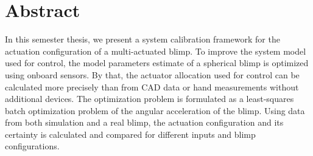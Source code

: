 \chapter*{Abstract}

In this semester thesis, we present a system calibration framework for the actuation configuration of a multi-actuated blimp.
To improve the system model used for control, the model parameters estimate of a spherical blimp is optimized using onboard sensors.
By that, the actuator allocation used for control can be calculated more precisely than from CAD data or hand measurements without additional devices.
The optimization problem is formulated as a least-squares batch optimization problem of the angular acceleration of the blimp.
Using data from both simulation and a real blimp, the actuation configuration and its certainty is calculated and compared for different inputs and blimp configurations.

